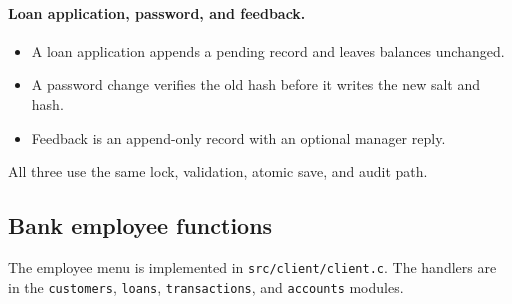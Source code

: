 \documentclass[11pt,a4paper]{article}
\begin{document}
\paragraph{Loan application, password, and feedback.}
\begin{itemize}
\item A loan application appends a pending record and leaves balances unchanged.
\item A password change verifies the old hash before it writes the new salt and hash.
\item Feedback is an append-only record with an optional manager reply.
\end{itemize}
All three use the same lock, validation, atomic save, and audit path.

\subsection{Bank employee functions}

The employee menu is implemented in \texttt{src/client/client.c}. The handlers are in the \texttt{customers}, \texttt{loans}, \texttt{transactions}, and \texttt{accounts} modules.
\end{document}
